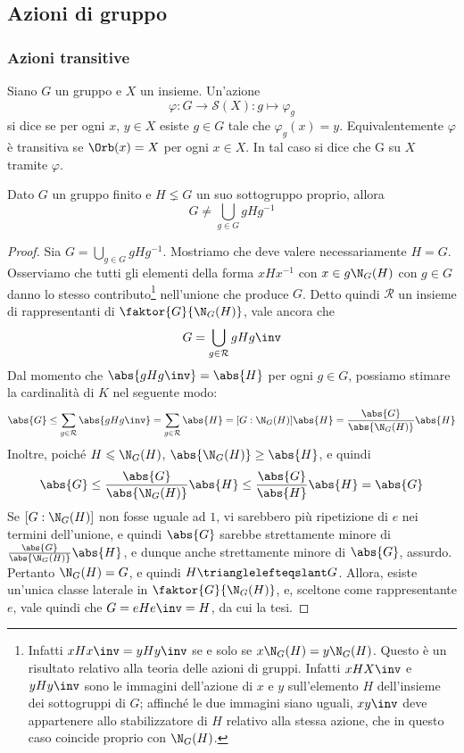 \documentclass[11pt]{scrartcl}
\begin{document}
	\newpage
	
	\subsection{Azioni di gruppo}
	
	\subsubsection{Azioni transitive}
	
	\begin{definition}
		Siano $G$ un gruppo e $X$ un insieme. Un'azione \[
		\varphi:G \to \mathcal{S}(X) :g \mapsto \varphi_g
		\]si dice  se per ogni $x$, $y \in X$ esiste $g \in G$
		tale che $\varphi_g(x) = y$. Equivalentemente $\varphi$ è transitiva se
		$\Orb(x) = X$ per ogni 
		$x \in X$. In tal caso si dice che G  su $X$ 
		tramite $\varphi$.
	\end{definition}
	
	\begin{lemma}
		\label{lemma1.40}
		Dato $G$ un gruppo finito e $H \lneq G$ un suo sottogruppo proprio, allora \[
		G \neq \bigcup_{g \in G}gHg^{-1}
		\]
	\end{lemma}
	
	\begin{proof}
		Sia $G = \bigcup_{g \in G}gHg^{-1}$. Mostriamo che deve valere necessariamente
		$H = G$. Osserviamo che tutti gli
		elementi della forma $xHx^{-1}$ con $x \in g \N_G(H)$ con $g \in G$ danno
		lo stesso contributo\footnote{
			Infatti $xHx\inv = yHy\inv$ se e solo se $x \N_G(H) = y \N_G(H)$. Questo
			è un risultato relativo alla teoria delle azioni di gruppi. Infatti
			$xHX\inv$ e $yHy\inv$ sono le immagini dell'azione di $x$ e $y$ sull'elemento
			$H$ dell'insieme dei sottogruppi di $G$; affinché le due immagini siano uguali,
			$xy\inv$ deve appartenere allo stabilizzatore di $H$ relativo alla stessa
			azione, che in questo caso coincide proprio con $\N_G(H)$.
		} nell'unione che produce $G$. Detto quindi $\mathcal{R}$ un
		insieme di rappresentanti di $\faktor{G}{\N_G(H)}$, vale ancora che
		\[ G  = \bigcup_{g \in \mathcal{R}} gHg\inv \]
		Dal momento che $\abs{gHg\inv} = \abs{H}$ per ogni $g \in G$, possiamo
		stimare la cardinalità di $K$ nel seguente modo:
		\[ \abs{G} \leq \sum_{g \in \mathcal{R}} \abs{gHg\inv} = \sum_{g \in \mathcal{R}} \abs{H} = [G : \N_G(H)] \abs{H} = \frac{\abs{G}}{\abs{\N_G(H)}} \abs{H} \]
		Inoltre, poiché $H \leqslant \N_G(H)$, $\abs{\N_G(H)} \geq \abs{H}$, e quindi
		\[ \abs{G} \leq \frac{\abs{G}}{\abs{\N_G(H)}} \abs{H} \leq \frac{\abs{G}}{\abs{H}} \abs{H} = \abs{G} \]
		Se $[G : \N_G(H)]$ non fosse uguale ad $1$, vi sarebbero più ripetizione di $e$
		nei termini dell'unione, e quindi $\abs{G}$ sarebbe strettamente minore di
		$\frac{\abs{G}}{\abs{\N_G(H)}} \abs{H}$, e dunque anche strettamente minore
		di $\abs{G}$, assurdo. Pertanto
		$\N_G(H) = G$, e quindi $H \trianglelefteqslant G$. Allora, esiste un'unica
		classe laterale in $\faktor{G}{\N_G(H)}$, e, sceltone come rappresentante $e$,
		vale quindi che $G = eHe\inv = H$, da cui la tesi.
	\end{proof}
	
\end{document}
